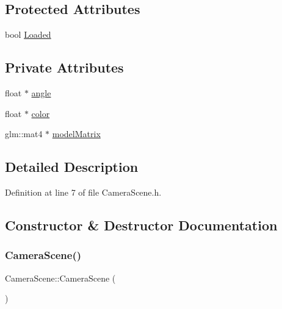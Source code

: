 \subsection*{Protected Attributes}
\begin{DoxyCompactItemize}
\item 
bool \mbox{\hyperlink{classEngine_1_1Components_1_1Scene_ae828757eea5410550f6674421051a783}{Loaded}}
\end{DoxyCompactItemize}
\subsection*{Private Attributes}
\begin{DoxyCompactItemize}
\item 
float $\ast$ \mbox{\hyperlink{classApplication_1_1Scenes_1_1CameraScene_a5b1ed7cbc9e95f0adf9f9ad9a9100d51}{angle}}
\item 
float $\ast$ \mbox{\hyperlink{classApplication_1_1Scenes_1_1CameraScene_a2ecbe017c52a0278302f8b8ffbc519ab}{color}}
\item 
glm\+::mat4 $\ast$ \mbox{\hyperlink{classApplication_1_1Scenes_1_1CameraScene_ac62c8a76d7ba9e9e25ec72d8513a46f4}{model\+Matrix}}
\end{DoxyCompactItemize}


\subsection{Detailed Description}


Definition at line 7 of file Camera\+Scene.\+h.



\subsection{Constructor \& Destructor Documentation}
\mbox{\label{classApplication_1_1Scenes_1_1CameraScene_a6276ab9be1ea87015c7508668e878edf}} 
\subsubsection{\texorpdfstring{Camera\+Scene()}{CameraScene()}}
{\footnotesize\ttfamily Camera\+Scene\+::\+Camera\+Scene (\begin{DoxyParamCaption}{ }\end{DoxyParamCaption})}



